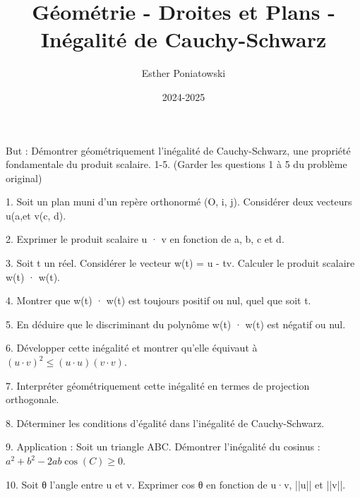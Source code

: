 \documentclass[10pt,a4paper]{article}
\title{Géométrie - Droites et Plans - Inégalité de Cauchy-Schwarz}
\author{Esther Poniatowski}
\date{2024-2025}
\begin{document}
\maketitle

But : Démontrer géométriquement l'inégalité de Cauchy-Schwarz, une propriété fondamentale du produit scalaire. 1-5. (Garder les questions 1 à 5 du problème original)

1. Soit un plan muni d'un repère orthonormé (O, i, j). Considérer deux vecteurs u(a,\ql et v(c, d).

2. Exprimer le produit scalaire u · v en fonction de a, b, c et d.

3. Soit t un réel. Considérer le vecteur w(t) = u - tv. Calculer le produit scalaire w(t) · w(t).

4. Montrer que w(t) · w(t) est toujours positif ou nul, quel que soit t.

5. En déduire que le discriminant du polynôme w(t) · w(t) est négatif ou nul.

6. Développer cette inégalité et montrer qu'elle équivaut à $(u \cdot v)^2 \leq (u \cdot u)(v \cdot v)$.

7. Interpréter géométriquement cette inégalité en termes de projection orthogonale.

8. Déterminer les conditions d'égalité dans l'inégalité de Cauchy-Schwarz.

9. Application : Soit un triangle ABC. Démontrer l'inégalité du cosinus : $a^2 + b^2 - 2ab \cos(C) \geq 0$.

10. Soit θ l'angle entre u et v. Exprimer cos θ en fonction de u·v, ||u|| et ||v||.
\end{document}
